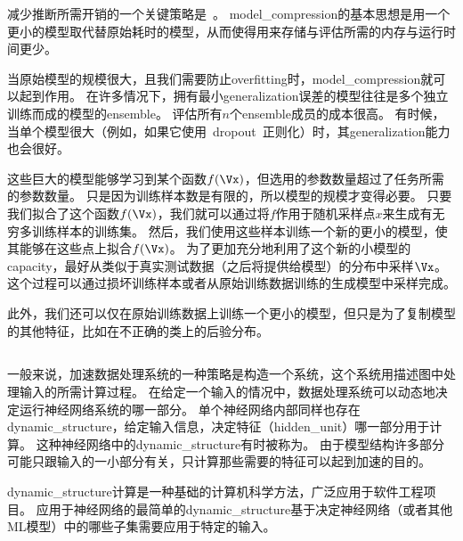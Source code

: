 减少推断所需开销的一个关键策略是~\citep{bucilua2006model}。
\gls{model_compression}的基本思想是用一个更小的模型取代替原始耗时的模型，从而使得用来存储与评估所需的内存与运行时间更少。



当原始模型的规模很大，且我们需要防止\gls{overfitting}时，\gls{model_compression}就可以起到作用。
在许多情况下，拥有最小\gls{generalization}误差的模型往往是多个独立训练而成的模型的\gls{ensemble}。
评估所有$n$个\gls{ensemble}成员的成本很高。
有时候，当单个模型很大（例如，如果它使用~\gls{dropout}~正则化）时，其\gls{generalization}能力也会很好。

这些巨大的模型能够学习到某个函数$f(\Vx)$，但选用的参数数量超过了任务所需的参数数量。
只是因为训练样本数是有限的，所以模型的规模才变得必要。
只要我们拟合了这个函数$f(\Vx)$，我们就可以通过将$f$作用于随机采样点$x$来生成有无穷多训练样本的训练集。
然后，我们使用这些样本训练一个新的更小的模型，使其能够在这些点上拟合$f(\Vx)$。
为了更加充分地利用了这个新的小模型的\gls{capacity}，最好从类似于真实测试数据（之后将提供给模型）的分布中采样$\Vx$。
这个过程可以通过损坏训练样本或者从原始训练数据训练的生成模型中采样完成。

此外，我们还可以仅在原始训练数据上训练一个更小的模型，但只是为了复制模型的其他特征，比如在不正确的类上的后验分布\citep{Hinton-dark-2014,hinton2015distilling}。

\subsection{}
\label{sec:dynamic_structure}

一般来说，加速数据处理系统的一种策略是构造一个系统，这个系统用描述图中处理输入的所需计算过程。
在给定一个输入的情况中，数据处理系统可以动态地决定运行神经网络系统的哪一部分。
单个神经网络内部同样也存在\gls{dynamic_structure}，给定输入信息，决定特征（\gls{hidden_unit}）哪一部分用于计算。
这种神经网络中的\gls{dynamic_structure}有时被称为\citep{Bengio-chapterSLSP-2013,bengio2013estimating}。
由于模型结构许多部分可能只跟输入的一小部分有关，只计算那些需要的特征可以起到加速的目的。

\gls{dynamic_structure}计算是一种基础的计算机科学方法，广泛应用于软件工程项目。
应用于神经网络的最简单的\gls{dynamic_structure}基于决定神经网络（或者其他\gls{ML}模型）中的哪些子集需要应用于特定的输入。

